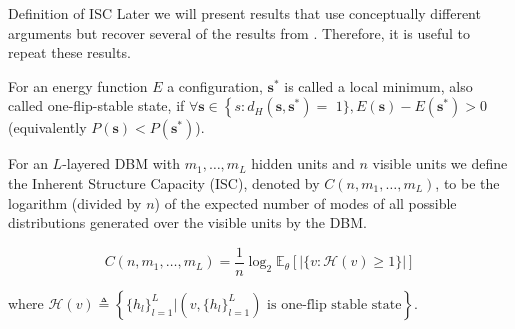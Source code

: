 \documentclass[8pt]{beamer}
\begin{document}
\begin{frame}[label={sec:orge513e7f}]{Definition of ISC}
Later we will present results that use conceptually different arguments but recover several of the results from \cite{bansal2018using}. Therefore, it is useful to repeat these results.
\begin{definition}
For an energy function \(E\) a configuration, \(\mathbf{s}^*\) is called a local minimum, also called one-flip-stable state, if \(\forall \mathbf{s} \in\left\{s: d_H\left(\mathbf{s}, \mathbf{s}^*\right)=\right.\) \(1\}, E(\mathbf{s})-E\left(\mathbf{s}^*\right)>0\) (equivalently \(P(\mathbf{s})<P\left(\mathbf{s}^*\right)\)).
\hfill \blacksquare
\label{org3398b6f}
\end{definition}
\begin{definition}
For an \(L\)-layered DBM with \(m_1, \ldots, m_L\) hidden units and \(n\) visible units we define the Inherent Structure Capacity (ISC), denoted by \(C(n, m_1, \ldots, m_L)\), to be the logarithm (divided by \(n\)) of the expected number of modes of all possible distributions generated over the visible units by the DBM.

\[
C(n, m_1, \ldots, m_L) = \frac{1}{n} \log_2 \mathbb{E}_{\theta} 
\left[ \lvert \{ v : \mathcal{H}(v) \geq 1 \} \rvert \right] \tag{8}
\]

where \(\mathcal{H}(v) \triangleq \left\{ \{h_l\}_{l=1}^L | (v, \{h_l\}_{l=1}^L) \text{ is one-flip stable state} \right\}\).
\hfill \blacksquare
\label{org8361ad5}
\end{definition}

\end{frame}
\end{document}
